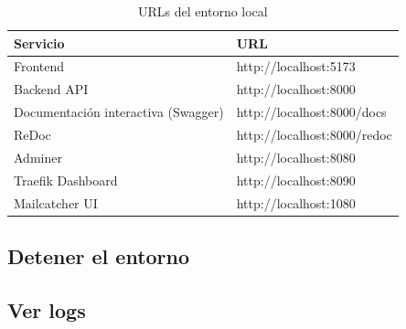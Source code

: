 \begin{longtable}[]{@{}ll@{}}
\caption[URLs del entorno local]{URLs del entorno local}\tabularnewline
\toprule\noalign{}
Servicio & URL \\
\midrule\noalign{}
\endhead
\bottomrule\noalign{}
\endlastfoot
Frontend & http://localhost:5173 \\
Backend API & http://localhost:8000 \\
Documentación interactiva (Swagger) & http://localhost:8000/docs \\
ReDoc & http://localhost:8000/redoc \\
Adminer & http://localhost:8080 \\
Traefik Dashboard & http://localhost:8090 \\
Mailcatcher UI & http://localhost:1080 \\
\end{longtable}

\subsection{Detener el entorno}\label{detener-el-entorno}

\begin{Shaded}
\begin{Highlighting}[]

\end{Highlighting}
\end{Shaded}

\subsection{Ver logs}\label{ver-logs}

\begin{Shaded}
\begin{Highlighting}[]
\end{Highlighting}
\end{Shaded}

